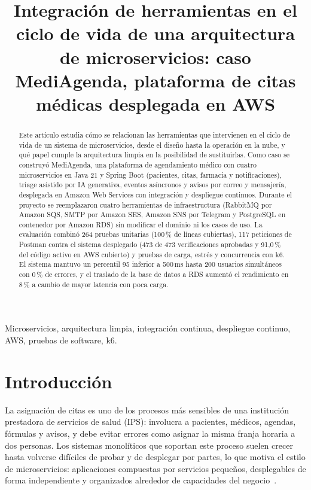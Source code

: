 \documentclass[conference]{IEEEtran}
\begin{document}
\title{Integración de herramientas en el ciclo de vida de una arquitectura de microservicios: caso MediAgenda, plataforma de citas médicas desplegada en AWS}

\author{
}

\maketitle

\begin{abstract}
Este artículo estudia cómo se relacionan las herramientas que intervienen en el ciclo de vida de un sistema de microservicios, desde el diseño hasta la operación en la nube, y qué papel cumple la arquitectura limpia en la posibilidad de sustituirlas. Como caso se construyó MediAgenda, una plataforma de agendamiento médico con cuatro microservicios en Java 21 y Spring Boot (pacientes, citas, farmacia y notificaciones), triage asistido por IA generativa, eventos asíncronos y avisos por correo y mensajería, desplegada en Amazon Web Services con integración y despliegue continuos. Durante el proyecto se reemplazaron cuatro herramientas de infraestructura (RabbitMQ por Amazon SQS, SMTP por Amazon SES, Amazon SNS por Telegram y PostgreSQL en contenedor por Amazon RDS) sin modificar el dominio ni los casos de uso. La evaluación combinó 264 pruebas unitarias (100\,\% de líneas cubiertas), 117 peticiones de Postman contra el sistema desplegado (473 de 473 verificaciones aprobadas y 91,0\,\% del código activo en AWS cubierto) y pruebas de carga, estrés y concurrencia con k6. El sistema mantuvo un percentil 95 inferior a 500\,ms hasta 200 usuarios simultáneos con 0\,\% de errores, y el traslado de la base de datos a RDS aumentó el rendimiento en 8\,\% a cambio de mayor latencia con poca carga.
\end{abstract}

\begin{IEEEkeywords}
Microservicios, arquitectura limpia, integración continua, despliegue continuo, AWS, pruebas de software, k6.
\end{IEEEkeywords}

\section{Introducción}
La asignación de citas es uno de los procesos más sensibles de una institución prestadora de servicios de salud (IPS): involucra a pacientes, médicos, agendas, fórmulas y avisos, y debe evitar errores como asignar la misma franja horaria a dos personas. Los sistemas monolíticos que soportan este proceso suelen crecer hasta volverse difíciles de probar y de desplegar por partes, lo que motiva el estilo de microservicios: aplicaciones compuestas por servicios pequeños, desplegables de forma independiente y organizados alrededor de capacidades del negocio~\cite{lewis2014,newman2021}.
\end{document}
